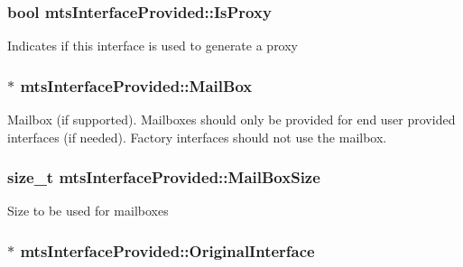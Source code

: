 \hypertarget{classmts_interface_provided_ae1d453e5968c61939ab1a7b8a94389f0}{
\subsubsection[{Is\-Proxy}]{\setlength{\rightskip}{0pt plus 5cm}bool mts\-Interface\-Provided\-::\-Is\-Proxy\hspace{0.3cm}{\ttfamily [protected]}}}\label{classmts_interface_provided_ae1d453e5968c61939ab1a7b8a94389f0}
Indicates if this interface is used to generate a proxy \hypertarget{classmts_interface_provided_a99b2ef9d3dec51002e722415589628bb}{
\subsubsection[{Mail\-Box}]{$\ast$ mts\-Interface\-Provided\-::\-Mail\-Box\hspace{0.3cm}{\ttfamily [protected]}}}\label{classmts_interface_provided_a99b2ef9d3dec51002e722415589628bb}
Mailbox (if supported). Mailboxes should only be provided for end user provided interfaces (if needed). Factory interfaces should not use the mailbox. \hypertarget{classmts_interface_provided_a5defbf0829c6a36bbf33baf52ec8f2f0}{
\subsubsection[{Mail\-Box\-Size}]{\setlength{\rightskip}{0pt plus 5cm}size\-\_\-t mts\-Interface\-Provided\-::\-Mail\-Box\-Size\hspace{0.3cm}{\ttfamily [protected]}}}\label{classmts_interface_provided_a5defbf0829c6a36bbf33baf52ec8f2f0}
Size to be used for mailboxes \hypertarget{classmts_interface_provided_aa3c7fd4efc804d522edf06f02aaf646e}{
\subsubsection[{Original\-Interface}]{$\ast$ mts\-Interface\-Provided\-::\-Original\-Interface\hspace{0.3cm}{\ttfamily [protected]}}}\label{classmts_interface_provided_aa3c7fd4efc804d522edf06f02aaf646e}
